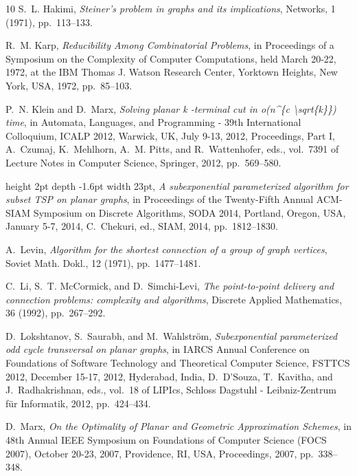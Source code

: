 \documentclass[a4paper,11pt]{article}
\theoremstyle{plain}
\newtheorem{identification rule}{Identification Rule}
\theoremstyle{definition}
\theoremstyle{remark}
\begin{document}
\begin{thebibliography}{10}
{\sc S.~L. Hakimi}, {\em Steiner's problem in graphs and its implications},
  Networks, 1 (1971), pp.~113--133.

{\sc R.~M. Karp}, {\em {Reducibility Among Combinatorial Problems}}, in
  Proceedings of a Symposium on the Complexity of Computer Computations, held
  March 20-22, 1972, at the {IBM} Thomas J. Watson Research Center, Yorktown
  Heights, New York, {USA}, 1972, pp.~85--103.

{\sc P.~N. Klein and D.~Marx}, {\em Solving planar k -terminal cut in
  {\textdollar}o(n{\^{}}\{c {\textbackslash}sqrt\{k\}\}){\textdollar} time}, in
  Automata, Languages, and Programming - 39th International Colloquium, {ICALP}
  2012, Warwick, UK, July 9-13, 2012, Proceedings, Part {I}, A.~Czumaj,
  K.~Mehlhorn, A.~M. Pitts, and R.~Wattenhofer, eds., vol.~7391 of Lecture
  Notes in Computer Science, Springer, 2012, pp.~569--580.

\leavevmode\vrule height 2pt depth -1.6pt width 23pt, {\em A subexponential
  parameterized algorithm for subset {TSP} on planar graphs}, in Proceedings of
  the Twenty-Fifth Annual {ACM-SIAM} Symposium on Discrete Algorithms, {SODA}
  2014, Portland, Oregon, USA, January 5-7, 2014, C.~Chekuri, ed., {SIAM},
  2014, pp.~1812--1830.

{\sc A.~Levin}, {\em Algorithm for the shortest connection of a group of graph
  vertices}, Soviet Math. Dokl., 12 (1971), pp.~1477--1481.

{\sc C.~Li, S.~T. McCormick, and D.~Simchi{-}Levi}, {\em The point-to-point
  delivery and connection problems: complexity and algorithms}, Discrete
  Applied Mathematics, 36 (1992), pp.~267--292.

{\sc D.~Lokshtanov, S.~Saurabh, and M.~Wahlstr{\"{o}}m}, {\em Subexponential
  parameterized odd cycle transversal on planar graphs}, in {IARCS} Annual
  Conference on Foundations of Software Technology and Theoretical Computer
  Science, {FSTTCS} 2012, December 15-17, 2012, Hyderabad, India, D.~D'Souza,
  T.~Kavitha, and J.~Radhakrishnan, eds., vol.~18 of LIPIcs, Schloss Dagstuhl -
  Leibniz-Zentrum f{\"{u}}r Informatik, 2012, pp.~424--434.

{\sc D.~Marx}, {\em {On the Optimality of Planar and Geometric Approximation
  Schemes}}, in 48th Annual {IEEE} Symposium on Foundations of Computer Science
  {(FOCS} 2007), October 20-23, 2007, Providence, RI, USA, Proceedings, 2007,
  pp.~338--348.


\end{thebibliography}
\end{document}
